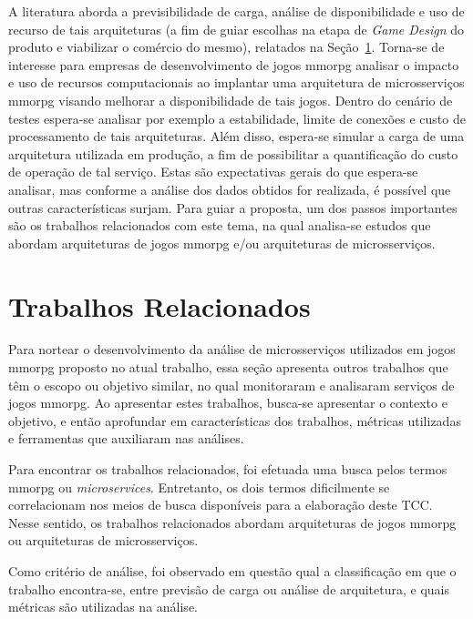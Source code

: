 A literatura aborda a previsibilidade de carga, análise de disponibilidade e uso de recurso de tais arquiteturas (a fim de guiar escolhas na etapa de \textit{Game Design} do produto e viabilizar o comércio do mesmo), relatados na Seção~\ref{sec:similares}.
%
Torna-se de interesse para empresas de desenvolvimento de jogos \ac{mmorpg} analisar o impacto e uso de recursos computacionais ao implantar uma arquitetura de microsserviços \ac{mmorpg} visando melhorar a disponibilidade de tais jogos.
%
Dentro do cenário de testes espera-se analisar por exemplo a estabilidade, limite de conexões e custo de processamento de tais arquiteturas.
%
Além disso, espera-se simular a carga de uma arquitetura utilizada em produção, a fim de possibilitar a quantificação do custo de operação de tal serviço.
%
Estas são expectativas gerais do que espera-se analisar, mas conforme a análise dos dados obtidos for realizada, é possível que outras características surjam.
%
Para guiar a proposta, um dos passos importantes são os trabalhos relacionados com este tema, na qual analisa-se estudos que abordam arquiteturas de jogos \ac{mmorpg} e/ou arquiteturas de microsserviços.



\section{Trabalhos Relacionados}
\label{sec:similares}



Para nortear o desenvolvimento da análise de microsserviços utilizados em jogos \ac{mmorpg} proposto no atual trabalho, essa seção apresenta outros trabalhos que têm o escopo ou objetivo similar, no qual monitoraram e analisaram serviços de jogos \ac{mmorpg}.
%
Ao apresentar estes trabalhos, busca-se apresentar o contexto e objetivo, e então aprofundar em características dos trabalhos, métricas utilizadas e ferramentas que auxiliaram nas análises.


Para encontrar os trabalhos relacionados, foi efetuada uma busca pelos termos \ac{mmorpg} ou \textit{microservices}.
%
Entretanto, os dois termos dificilmente se correlacionam nos meios de busca disponíveis para a elaboração deste TCC.
%
Nesse sentido, os trabalhos relacionados abordam arquiteturas de jogos \ac{mmorpg} ou arquiteturas de microsserviços.



Como critério de análise, foi observado em questão qual a classificação em que o trabalho encontra-se, entre previsão de carga ou análise de arquitetura, e quais métricas são utilizadas na análise.

